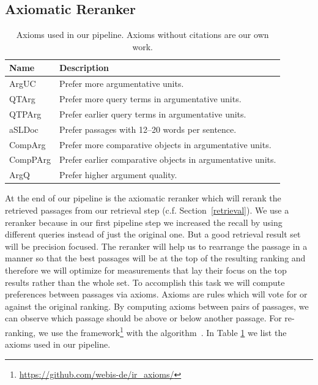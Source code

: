 \subsection{Axiomatic Reranker}

\begin{table}
    \caption{Axioms used in our pipeline. Axioms without citations are our own work.}
    \label{table-axioms}
    \begin{tabular}{ll}
        \toprule
        \textbf{Name} & \textbf{Description} \\
        \midrule
        ArgUC~\cite{BondarenkoHVSPB2018} & Prefer more argumentative units. \\
        QTArg~\cite{BondarenkoHVSPB2018} & Prefer more query terms in argumentative units. \\
        QTPArg~\cite{BondarenkoHVSPB2018} & Prefer earlier query terms in argumentative units. \\
        aSLDoc~\cite{BondarenkoFKHVS2019} & Prefer passages with 12--20 words per sentence. \\
        CompArg & Prefer more comparative objects in argumentative units. \\
        CompPArg & Prefer earlier comparative objects in argumentative units. \\
        ArgQ & Prefer higher argument quality. \\ 
        \bottomrule
    \end{tabular}
\end{table}

At the end of our pipeline is the axiomatic reranker which will rerank the retrieved passages from our retrieval step (c.f. Section~\ref{retrieval}).
We use a reranker because in our first pipeline step we increased the recall by using different queries instead of just the original one.
But a good retrieval result set will be precision focused.
The reranker will help us to rearrange the passage in a manner so that the best passages will be at the top of the resulting ranking and therefore we will optimize for measurements that lay their focus on the top results rather than the whole set.
To accomplish this task we will compute preferences between passages via axioms.
Axioms are rules which will vote for or against the original ranking.
By computing axioms between pairs of passages, we can observe which passage should be above or below another passage.
For re-ranking, we use the \iraxioms framework\footnote{\url{https://github.com/webis-de/ir_axioms/}} with the \KwikSort algorithm~\cite{HagenVGS2016}.
In Table \ref{table-axioms} we list the axioms used in our pipeline.

